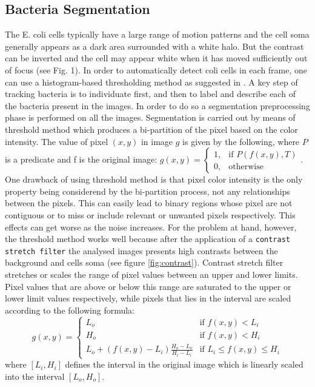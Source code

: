 \documentclass[conference]{IEEEtran}
\begin{document}
\subsection{Bacteria Segmentation}
The E. coli cells typically have a large range of motion patterns
and the cell soma generally appears as a dark area surrounded
with a white halo. But the contrast can be inverted
and the cell may appear white when it has moved sufficiently
out of focus (see Fig. 1). In order to automatically detect coli
cells in each frame, one can use a histogram-based thresholding
method as suggested in \cite{Cho:1989}.
A key step of tracking bacteria is to individuate first, and then to label and describe each of the bacteria present in the images. In order to do so a segmentation preprocessing phase is performed on all the images. 
Segmentation  is carried out by means of threshold method \cite{Shapiro:2002} which produces a bi-partition of the pixel based on the color intensity. The value of pixel $(x,y)$ in image $g$ is given by the following, where $P$ is a predicate and f is the original image:
${g(x,y) = \begin{cases} 1, & \mbox{if } P(f(x,y),T) \\ 0, & \mbox{otherwise }\end{cases}}$.
One drawback of using threshold method is that pixel color intensity is the only property being considerend by the bi-partition process, not any relationships between the pixels. This can easily lead to binary regions whose pixel are not contiguous or to miss or include relevant or unwanted pixels respectively. This effects can get worse as the noise increases. For the problem at hand, however, the threshold method works well because after the application of a \texttt{contrast stretch filter} the analysed images presents high contrasts between the background and cells soma (see figure \ref{fig:contrast}). Contrast stretch filter  stretches or scales the range of pixel values between an upper and lower limits. Pixel values that are above or below this range are saturated to the upper or lower limit values respectively, while pixels that lies in the interval are scaled according to the following formula: 
\[{g(x,y) = \begin{cases} L_o & \mbox{if } f(x,y) < L_i \\  H_o & \mbox{if } f(x,y) < H_i\\ L_o + (f(x,y)-L_i)\frac{H_o-L_o}{H_i-L_i} & \mbox{if } L_i \leq f(x,y) \leq H_i\end{cases}}\] where  $[L_i,H_i]$ defines the interval in the original image which is linearly scaled into the interval $[L_o,H_o]$.
\end{document}
